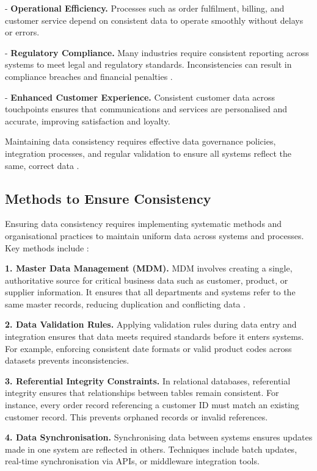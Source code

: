 - \textbf{Operational Efficiency.} Processes such as order fulfilment, billing, and customer service depend on consistent data to operate smoothly without delays or errors.

- \textbf{Regulatory Compliance.} Many industries require consistent reporting across systems to meet legal and regulatory standards. Inconsistencies can result in compliance breaches and financial penalties \cite{rahm2000dataquality}.

- \textbf{Enhanced Customer Experience.} Consistent customer data across touchpoints ensures that communications and services are personalised and accurate, improving satisfaction and loyalty.

Maintaining data consistency requires effective data governance policies, integration processes, and regular validation to ensure all systems reflect the same, correct data \cite{ottoo2013data}.

\subsection{Methods to Ensure Consistency}

Ensuring data consistency requires implementing systematic methods and organisational practices to maintain uniform data across systems and processes. Key methods include \cite{watson2009data}:

\textbf{1. Master Data Management (MDM).}  
MDM involves creating a single, authoritative source for critical business data such as customer, product, or supplier information. It ensures that all departments and systems refer to the same master records, reducing duplication and conflicting data \cite{otto2011mdm}.

\textbf{2. Data Validation Rules.}  
Applying validation rules during data entry and integration ensures that data meets required standards before it enters systems. For example, enforcing consistent date formats or valid product codes across datasets prevents inconsistencies.

\textbf{3. Referential Integrity Constraints.}  
In relational databases, referential integrity ensures that relationships between tables remain consistent. For instance, every order record referencing a customer ID must match an existing customer record. This prevents orphaned records or invalid references.

\textbf{4. Data Synchronisation.}  
Synchronising data between systems ensures updates made in one system are reflected in others. Techniques include batch updates, real-time synchronisation via APIs, or middleware integration tools.

